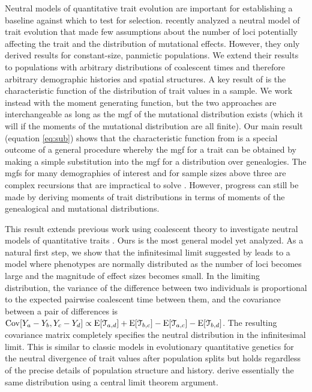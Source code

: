 Neutral models of quantitative trait evolution are important for establishing a
baseline against which to test for selection. \citet{Schraiber2015} recently
analyzed a neutral model of trait evolution that made few assumptions about the
number of loci potentially affecting the trait and the distribution of
mutational effects. However, they only derived results for constant-size,
panmictic populations. We extend their results to populations with arbitrary
distributions of coalescent times and therefore arbitrary demographic histories
and spatial structures. A key result of \citet{Schraiber2015} is the
characteristic function of the distribution of trait values in a sample. We work
instead with the moment generating function, but the two approaches are
interchangeable as long as the mgf of the mutational distribution exists (which
it will if the moments of the mutational distribution are all finite). Our main
result (equation \eqref{eq:sub}) shows that the characteristic function
from \citet{Schraiber2015} is a special outcome of a general procedure whereby
the mgf for a trait can be obtained by making a simple substitution into the mgf
for a distribution over genealogies. The mgfs for many demographies of interest
and for sample sizes above three are complex recursions that are impractical to
solve \citep{Lohse2011}. However, progress can still be made by deriving moments
of trait distributions in terms of moments of the genealogical and mutational
distributions.

This result extends previous work using coalescent theory to investigate neutral
models of quantitative traits \citep{Whitlock1999,Schraiber2015}. Ours is the
most general model yet analyzed. As a natural first step, we show that the
infinitesimal limit suggested by \citet{Fisher1918} leads to a model where
phenotypes are normally distributed as the number of loci becomes large and the
magnitude of effect sizes becomes small. In the limiting distribution, the
variance of the difference between two individuals is proportional to the
expected pairwise coalescent time between them, and the covariance between a
pair of differences is $\mathrm{Cov}[Y_a - Y_b,Y_c - Y_d] \propto \mathrm{E}[\mathcal{T}_{a,d}]
+ \mathrm{E}[\mathcal{T}_{b,c}] -
\mathrm{E}[\mathcal{T}_{a,c}] - \mathrm{E}[\mathcal{T}_{b,d}]$. The resulting covariance matrix
completely specifies the neutral distribution in the infinitesimal limit. This
is similar to classic models in evolutionary quantitative genetics for the
neutral divergence of trait values after population splits
\citep{Lande1976,Lynch1989} but holds regardless of the precise details of
population structure and history. \citet{Schraiber2015} derive essentially the
same distribution using a central limit theorem argument.

